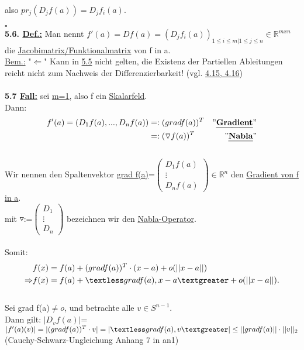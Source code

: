 \documentclass[]{scrartcl}
\begin{document}
	also $pr_j(D_jf(a))=D_jf_i(a)$.\\
	\strut\hfill$\square$\\
	\textbf{5.6. \underline{Def.:}} Man nennt $f'(a)=Df(a)=(D_jf_i(a))_{1\leq 
	i\leq m|1\leq j\leq n}\in\mathbb{R}^{m x n}$\\
	die \ul{Jacobimatrix/Funktionalmatrix} von f in a.\\
	\underline{Bem.:} "$\Leftarrow$" Kann in \ul{5.5} nicht gelten, die Existenz der Partiellen Ableitungen reicht nicht zum Nachweis der Differenzierbarkeit! (vgl. \ul{4.15, 4.16})\\
	\\
	\textbf{5.7 \underline{Fall:}} sei \underline{\underline{m=1}}, also f ein \underline{Skalarfeld}.\\
	Dann: \begin{align}
		f'(a)=(D_1f(a),...,D_nf(a))&=:(grad f(a))^T &"\ul{\textbf{Gradient}}"\\
		&=:(\triangledown f(a))^T &"\ul{\textbf{Nabla}}"
	\end{align}\\
	Wir nennen den Spaltenvektor  \ul{grad f(a)}=$\begin{pmatrix}
		D_1f(a)\\\vdots\\D_nf(a)
	\end{pmatrix} \in \mathbb{R}^n$ den \ul{Gradient von f in a}.\\
	 mit \ul{$\triangledown$}:=$\begin{pmatrix}
		D_1\\\vdots\\D_n
	\end{pmatrix}$ bezeichnen wir den \ul{Nabla-Operator}.\\
	\\
	Somit:\begin{align}
		&f(x)=f(a)+(grad f(a))^T\cdot(x-a)+o(||x-a||)\\
		\Rightarrow &f(x)=f(a)+\textless grad f(a), x-a\textgreater + o(||x-a||).
	\end{align}\\
	Sei grad f(a)$\neq o$, und betrachte alle $v\in S^{n-1}$.\\
	Dann gilt: \ul{$|D_vf(a)|$}=$|f'(a)(v)|=|(grad f(a))^T\cdot v|\\
	=|\textless grad f(a),v\textgreater|\leq ||grad f(a)||\cdot ||v||_2$ 
	(Cauchy-Schwarz-Ungleichung Anhang 7 in an1)\\
\end{document}
